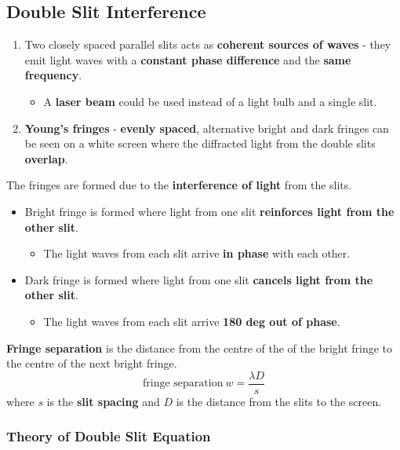 \subsection{Double Slit Interference}

\begin{enumerate}
    \item Two closely spaced parallel slits acts as \textbf{coherent sources of waves} - they emit light waves with a \textbf{constant phase difference} and the \textbf{same frequency}.
        \begin{itemize}
            \item A \textbf{laser beam} could be used instead of a light bulb and a single slit.
        \end{itemize}
    \item \textbf{Young's fringes} - \textbf{evenly spaced}, alternative bright and dark fringes can be seen on a white screen where the diffracted light from the double slits \textbf{overlap}.
\end{enumerate}

The fringes are formed due to the \textbf{interference of light} from the slits.
\begin{itemize}
    \item Bright fringe is formed where light from one slit \textbf{reinforces light from the other slit}.
        \begin{itemize}
            \item The light waves from each slit arrive \textbf{in phase} with each other.
        \end{itemize}
    \item Dark fringe is formed where light from one slit \textbf{cancels light from the other slit}.
        \begin{itemize}
            \item The light waves from each slit arrive \textbf{180 deg out of phase}.
        \end{itemize}
\end{itemize}

\textbf{Fringe separation} is the distance from the centre of the of the bright fringe to the centre of the next bright fringe.
$$\text{fringe separation}\ w=\frac{\lambda D}{s}$$
where $s$ is the \textbf{slit spacing} and $D$ is the distance from the slits to the screen.

\subsubsection*{Theory of Double Slit Equation}

